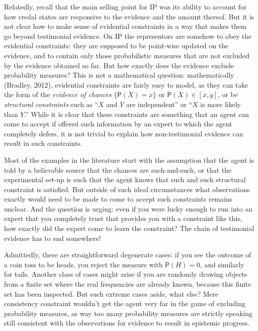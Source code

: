 \documentclass[
  10pt,
  dvipsnames,enabledeprecatedfontcommands]{scrartcl}
\begin{document}
Relatedly, recall that the main selling point for \textsf{IP} was its
ability to account for how credal states are responsive to the evidence
and the amount thereof. But it is not clear how to make sense of
evidential constraints in a way that makes them go beyond testimonial
evidence. On \textsf{IP} the representors are somehow to obey the
evidential constraints: they are supposed to be point-wise updated on
the evidence, and to contain only those probabilistic measures that are
not excluded by the evidence obtained so far. But how exactly does the
evidence exclude probability measures? This is not a mathematical
question: mathematically (Bradley, 2012), evidential constraints are
fairly easy to model, as they can take the form of the
\emph{evidence of chances} \(\{ \mathsf{P}(X) = x\}\) or
\(\mathsf{P}(X) \in [x,y]\), or be \emph{structural constraints} such as
``\(X\) and \(Y\) are independent'' or ``\(X\) is more likely than
\(Y\).'' While it is clear that these constraints are something that an
agent can come to accept if offered such information by an expert to
which the agent completely defers, it is not trivial to explain how
non-testimonial evidence can result in such constraints.

Most of the examples in the literature start with the assumption that
the agent is told by a believable source that the chances are
such-and-such, or that the experimental set-up is such that the agent
knows that such and such structural constraint is satisfied. But outside
of such ideal circumstances what observations exactly would need to be
made to come to accept such constraints remains unclear. And the
question is urging: even if you were lucky enough to run into an expert
that you completely trust that provides you with a constraint like this,
how exactly did the expert come to learn the constraint? The chain of
testimonial evidence has to end somewhere!

Admittedly, there are straightforward degenerate cases: if you see the
outcome of a coin toss to be heads, you reject the measure with
\(\mathsf{P}(H)=0\), and similarly for tails. Another class of cases
might arise if you are randomly drawing objects from a finite set where
the real frequencies are already known, because this finite set has been
inspected. But such extreme cases aside, what else? Mere consistency
constraint wouldn't get the agent very far in the game of excluding
probability measures, as way too many probability measures are strictly
speaking still consistent with the observations for evidence to result
in epistemic progress.
\end{document}
